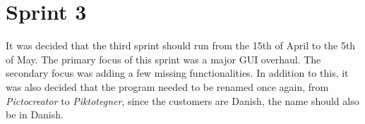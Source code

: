 \chapter{Sprint 3}
It was decided that the third sprint should run from the 15th of April to the 5th of May.
The primary focus of this sprint was a major GUI overhaul.
The secondary focus was adding a few missing functionalities.
In addition to this, it was also decided that the program needed to be renamed once again, from \textit{Pictocreator} to \textit{Piktotegner}, since the customers are Danish, the name should also be in Danish.





